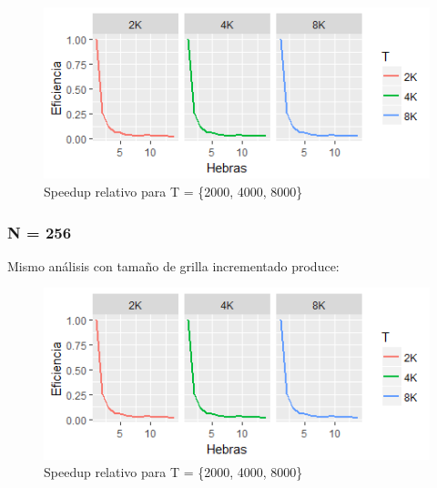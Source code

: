 \documentclass[jou]{apa6}
\begin{document}
\begin{figure}[h]
	\includegraphics[width=\columnwidth]{efic-128px.png}
	\caption{Speedup relativo para T = \{2000, 4000, 8000\}}
	\label{fig:Figure5}
\end{figure}

\subsubsection{N = 256}
Mismo análisis con tamaño de grilla incrementado produce:

\begin{figure}[h]
	\includegraphics[width=\columnwidth]{efic-256px.png}
	\caption{Speedup relativo para T = \{2000, 4000, 8000\}}
	\label{fig:Figure6}
\end{figure}
\end{document}
